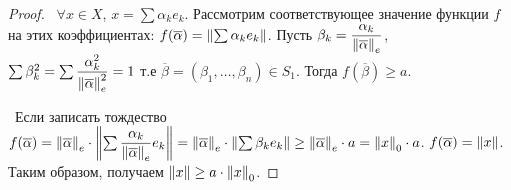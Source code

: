 \begin{proof}
\smallskip
\noindent \textbullet~$\forall x \in X$, $ x = \sum \alpha_k e_k$. Рассмотрим соответствующее значение функции $f$ на этих коэффициентах: $f(\overline{\alpha}) = 
\left\lVert\sum \alpha_k e_k\right\rVert$. Пусть $\beta_k = \dfrac{\alpha_k}{\left\lVert\overline{\alpha}\right\rVert_e}$, $\sum \beta^2_k = \sum \dfrac{\alpha^2_k}{\left\lVert\overline{\alpha}\right\rVert^2_e} = 1$
 т.е $\overline{\beta} = (\beta_1, \dots, \beta_n) \in S_1$. Тогда $f(\overline{\beta}) \ge a$.

\smallskip 
\noindent \textbullet~Если записать тождество $f(\overline{\alpha}) = \left\lVert\overline{\alpha}\right\rVert_e \cdot \left\lVert\sum \dfrac{\alpha_k}{\left\lVert\overline{\alpha}\right\rVert_e} e_k\right\rVert 
= \left\lVert\overline{\alpha}\right\rVert_e \cdot \left\lVert\sum \beta_k e_k\right\rVert
\ge \left\lVert\overline{\alpha}\right\rVert_e \cdot a = \left\lVert x\right\rVert_0 \cdot a$. $f(\overline{\alpha}) = \left\lVert x\right\rVert$. Таким образом, получаем $\left\lVert x\right\rVert \ge a \cdot \left\lVert x\right\rVert_0$.
\end{proof}